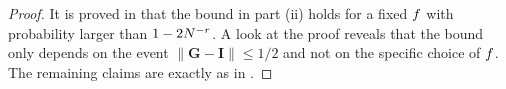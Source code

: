 \begin{proof}
	It is proved in \cite[Theorem 2]{cohen2016optimal} that the bound in part (ii) holds for a fixed $f$ with probability larger than $1-2N^{-r}$. A look at the proof reveals that the bound only depends on the event $\|{\mathbf{G}-\mathbf{I}}\|\leq 1/2$ and not on the specific choice of $f$. The remaining claims are exactly as in \cite{cohen2016optimal}.
\end{proof}



